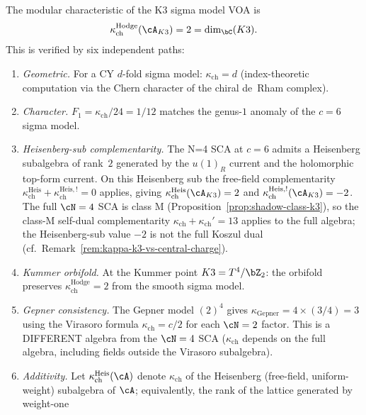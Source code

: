 \begin{proposition}
\label{prop:kappa-k3}
The modular characteristic of the K3 sigma model VOA is
\begin{equation}\label{eq:kappa-k3}
\kappa_{\mathrm{ch}}^{\mathrm{Hodge}}(\cA_{K3}) = 2 = \dim_\bC(K3).
\end{equation}
This is verified by six independent paths:
\begin{enumerate}[label=\textup{(\roman*)}]
\item \emph{Geometric.} For a CY $d$-fold sigma model:
 $\kappa_{\mathrm{ch}} = d$ \textup{(}index-theoretic computation via
 the Chern character of the chiral de~Rham complex\textup{)}.
\item \emph{Character.} $F_1 = \kappa_{\mathrm{ch}}/24 = 1/12$ matches the
 genus-$1$ anomaly of the $c = 6$ sigma model.
\item \emph{Heisenberg-sub complementarity.}
 The N=4 SCA at $c = 6$ admits a Heisenberg subalgebra of rank~$2$
 generated by the $u(1)_R$ current and the holomorphic
 top-form current. On this Heisenberg sub the free-field
 complementarity $\kappa_{\mathrm{ch}}^{\mathrm{Heis}}
 + \kappa_{\mathrm{ch}}^{\mathrm{Heis},!} = 0$ applies, giving
 $\kappa_{\mathrm{ch}}^{\mathrm{Heis}}(\cA_{K3}) = 2$ and
 $\kappa_{\mathrm{ch}}^{\mathrm{Heis},!}(\cA_{K3}) = -2$. The
 full $\cN = 4$ SCA is class M
 (Proposition~\ref{prop:shadow-class-k3}), so the
 class-M self-dual complementarity
 $\kappa_{\mathrm{ch}} + \kappa_{\mathrm{ch}}' = 13$ applies
 to the full algebra; the Heisenberg-sub value $-2$ is
 not the full Koszul dual (cf.\ Remark~\ref{rem:kappa-k3-vs-central-charge}).
\item \emph{Kummer orbifold.} At the Kummer point $K3 = T^4/\bZ_2$:
 the orbifold preserves $\kappa_{\mathrm{ch}}^{\mathrm{Hodge}} = 2$ from the smooth sigma model.
\item \emph{Gepner consistency.} The Gepner model $(2)^4$ gives
 $\kappa_{\mathrm{Gepner}} = 4 \times (3/4) = 3$ using the
 Virasoro formula $\kappa_{\mathrm{ch}} = c/2$ for each $\cN = 2$ factor.
 This is a DIFFERENT algebra from the $\cN = 4$ SCA
 \textup{(}$\kappa_{\mathrm{ch}}$ depends on the full algebra,
 including fields outside the Virasoro subalgebra\textup{)}.
\item \emph{Additivity.} Let
 $\kappa_{\mathrm{ch}}^{\mathrm{Heis}}(\cA)$ denote $\kappa_{\mathrm{ch}}$
 of the Heisenberg (free-field, uniform-weight) subalgebra of $\cA$;
 equivalently, the rank of the lattice generated by weight-one

\end{enumerate}
\end{proposition}
